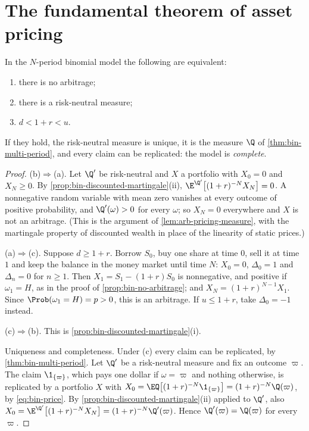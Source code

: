 \section{The fundamental theorem of asset pricing}\label{sec:bin-ftap}

\begin{theorem}\label{thm:bin-ftap}
In the $N$-period binomial model the following are equivalent:
\begin{enumerate}[label=(\alph*)]
  \item there is no arbitrage;
  \item there is a risk-neutral measure;
  \item $d<1+r<u$.
\end{enumerate}
If they hold, the risk-neutral measure is unique, it is the measure $\Q$ of
\cref{thm:bin-multi-period}, and every claim can be replicated: the model is
\emph{complete}.
\end{theorem}

\begin{proof}
(b)$\Rightarrow$(a). Let $\Q'$ be risk-neutral and $X$ a portfolio with $X_0=0$ and
$X_N\ge0$. By \cref{prop:bin-discounted-martingale}(ii),
$\E^{\Q'}\big[(1+r)^{-N}X_N\big]=0$. A nonnegative random variable with mean zero
vanishes at every outcome of positive probability, and $\Q'(\omega)>0$ for every
$\omega$; so $X_N=0$ everywhere and $X$ is not an arbitrage. (This is the argument of
\cref{lem:arb-pricing-measure}, with the martingale property of discounted wealth in place
of the linearity of static prices.)

(a)$\Rightarrow$(c). Suppose $d\ge1+r$. Borrow $S_0$, buy one share at time $0$, sell it
at time $1$ and keep the balance in the money market until time $N$: $X_0=0$,
$\Delta_0=1$ and $\Delta_n=0$ for $n\ge1$. Then $X_1=S_1-(1+r)S_0$ is nonnegative, and
positive if $\omega_1=H$, as in the proof of \cref{prop:bin-no-arbitrage}; and
$X_N=(1+r)^{N-1}X_1$. Since $\Prob(\omega_1=H)=p>0$, this is an arbitrage. If $u\le1+r$,
take $\Delta_0=-1$ instead.

(c)$\Rightarrow$(b). This is \cref{prop:bin-discounted-martingale}(i).

Uniqueness and completeness. Under (c) every claim can be replicated, by
\cref{thm:bin-multi-period}. Let $\Q'$ be a risk-neutral measure and fix an outcome
$\varpi$. The claim $\1_{\{\varpi\}}$, which pays one dollar if $\omega=\varpi$ and nothing
otherwise, is replicated by a portfolio $X$ with
$X_0=\EQ\big[(1+r)^{-N}\1_{\{\varpi\}}\big]=(1+r)^{-N}\Q(\varpi)$, by \eqref{eq:bin-price}.
By \cref{prop:bin-discounted-martingale}(ii) applied to $\Q'$, also
$X_0=\E^{\Q'}\big[(1+r)^{-N}X_N\big]=(1+r)^{-N}\Q'(\varpi)$. Hence $\Q'(\varpi)=\Q(\varpi)$
for every $\varpi$.
\end{proof}

